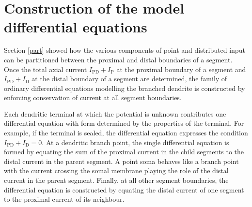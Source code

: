 \section{Construction of the model differential equations}
Section \ref{part} showed how the various components of point and
distributed input can be partitioned between the proximal and
distal boundaries of a segment. Once the total axial current
$I_\mathrm{PD}+I_\mathrm{P}$ at the proximal boundary of a segment
and $I_\mathrm{PD}+I_\mathrm{D}$ at the distal boundary of a
segment are determined, the family of ordinary differential
equations modelling the branched dendrite is constructed by
enforcing conservation of current at all segment boundaries.

Each dendritic terminal at which the potential is unknown
contributes one differential equation with form determined by the
properties of the terminal. For example, if the terminal is
sealed, the differential equation expresses the condition
$I_\mathrm{PD}+I_\mathrm{D}=0$. At a dendritic branch point, the
single differential equation is formed by equating the sum of the
proximal current in the child segments to the distal current in
the parent segment. A point soma behaves like a branch point with
the current crossing the somal membrane playing the role of the
distal current in the parent segment. Finally, at all other
segment boundaries, the differential equation is constructed by
equating the distal current of one segment to the proximal current
of its neighbour.

